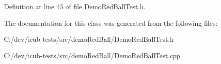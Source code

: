 Definition at line 45 of file Demo\+Red\+Ball\+Test.\+h.



The documentation for this class was generated from the following files\+:\begin{DoxyCompactItemize}
\item 
C\+:/dev/icub-\/tests/src/demo\+Red\+Ball/Demo\+Red\+Ball\+Test.\+h\item 
C\+:/dev/icub-\/tests/src/demo\+Red\+Ball/Demo\+Red\+Ball\+Test.\+cpp\end{DoxyCompactItemize}
